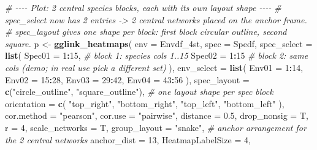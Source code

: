 \documentclass[
]{book}
\newenvironment{Shaded}{\begin{snugshade}}{\end{snugshade}}
\newcommand{\AttributeTok}[1]{\textcolor[rgb]{0.13,0.29,0.53}{#1}}
\newcommand{\CommentTok}[1]{\textcolor[rgb]{0.56,0.35,0.01}{\textit{#1}}}
\newcommand{\DecValTok}[1]{\textcolor[rgb]{0.00,0.00,0.81}{#1}}
\newcommand{\FloatTok}[1]{\textcolor[rgb]{0.00,0.00,0.81}{#1}}
\newcommand{\FunctionTok}[1]{\textcolor[rgb]{0.13,0.29,0.53}{\textbf{#1}}}
\newcommand{\NormalTok}[1]{#1}
\newcommand{\OtherTok}[1]{\textcolor[rgb]{0.56,0.35,0.01}{#1}}
\newcommand{\SpecialCharTok}[1]{\textcolor[rgb]{0.81,0.36,0.00}{\textbf{#1}}}
\newcommand{\StringTok}[1]{\textcolor[rgb]{0.31,0.60,0.02}{#1}}
\begin{document}
\begin{Shaded}
\begin{Highlighting}[]
\CommentTok{\# {-}{-}{-}{-} Plot: 2 central species blocks, each with its own layout shape {-}{-}{-}{-}}
\CommentTok{\# \textasciigrave{}spec\_select\textasciigrave{} now has 2 entries {-}\textgreater{} 2 central networks placed on the anchor frame.}
\CommentTok{\# \textasciigrave{}spec\_layout\textasciigrave{} gives one shape per block: first block circular outline, second square.}
\NormalTok{p }\OtherTok{\textless{}{-}} \FunctionTok{gglink\_heatmaps}\NormalTok{(}
  \AttributeTok{env                =}\NormalTok{ Envdf\_4st,}
  \AttributeTok{spec               =}\NormalTok{ Spedf,}
  \AttributeTok{spec\_select        =} \FunctionTok{list}\NormalTok{(}
    \AttributeTok{Spec01 =} \DecValTok{1}\SpecialCharTok{:}\DecValTok{15}\NormalTok{,                       }\CommentTok{\# block 1: species cols 1..15}
    \AttributeTok{Spec02 =} \DecValTok{1}\SpecialCharTok{:}\DecValTok{15}                        \CommentTok{\# block 2: same cols (demo; in real use pick a different set)}
\NormalTok{  ),}
  \AttributeTok{env\_select         =} \FunctionTok{list}\NormalTok{(}
    \AttributeTok{Env01 =} \DecValTok{1}\SpecialCharTok{:}\DecValTok{14}\NormalTok{,}
    \AttributeTok{Env02 =} \DecValTok{15}\SpecialCharTok{:}\DecValTok{28}\NormalTok{,}
    \AttributeTok{Env03 =} \DecValTok{29}\SpecialCharTok{:}\DecValTok{42}\NormalTok{,}
    \AttributeTok{Env04 =} \DecValTok{43}\SpecialCharTok{:}\DecValTok{56}
\NormalTok{  ),}
  \AttributeTok{spec\_layout        =} \FunctionTok{c}\NormalTok{(}\StringTok{"circle\_outline"}\NormalTok{, }\StringTok{"square\_outline"}\NormalTok{),  }\CommentTok{\# one layout shape per spec block}
  \AttributeTok{orientation        =} \FunctionTok{c}\NormalTok{(}
    \StringTok{"top\_right"}\NormalTok{,}
    \StringTok{"bottom\_right"}\NormalTok{,}
    \StringTok{"top\_left"}\NormalTok{,}
    \StringTok{"bottom\_left"}
\NormalTok{  ),}
  \AttributeTok{cor.method         =} \StringTok{"pearson"}\NormalTok{,}
  \AttributeTok{cor.use            =} \StringTok{"pairwise"}\NormalTok{,}
  \AttributeTok{distance           =} \FloatTok{0.5}\NormalTok{,}
  \AttributeTok{drop\_nonsig        =}\NormalTok{ T,}
  \AttributeTok{r                  =} \DecValTok{4}\NormalTok{,}
  \AttributeTok{scale\_networks     =}\NormalTok{ T,}
  \AttributeTok{group\_layout       =} \StringTok{"snake"}\NormalTok{,          }\CommentTok{\# anchor arrangement for the 2 central networks}
  \AttributeTok{anchor\_dist        =} \DecValTok{13}\NormalTok{,}
  \AttributeTok{HeatmapLabelSize   =} \DecValTok{4}\NormalTok{,}

\end{Highlighting}
\end{Shaded}
\end{document}
